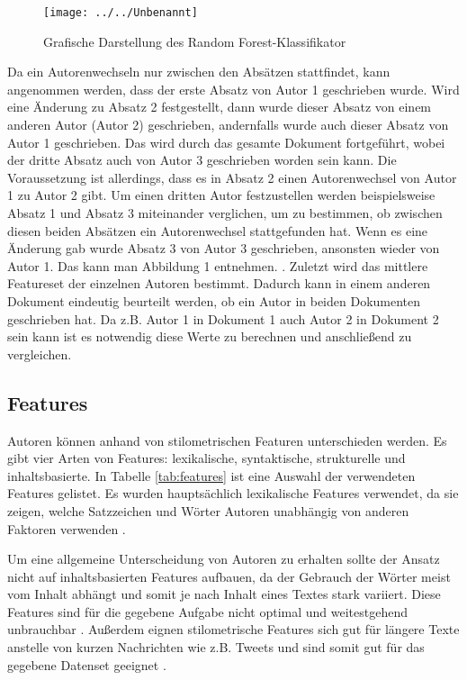 \documentclass[conference]{IEEEtran}
\begin{document}
	\begin{figure}[h]
		\centering
		\texttt{[image: ../../Unbenannt]}
		\caption{Grafische Darstellung des Random Forest-Klassifikator}
		\label{fig:algorithm}
	\end{figure}
	
	
	Da ein Autorenwechseln nur zwischen den Absätzen stattfindet, kann angenommen werden, dass der erste Absatz von Autor 1 geschrieben wurde. Wird eine Änderung zu Absatz 2 festgestellt, dann wurde dieser Absatz von einem anderen Autor (Autor 2) geschrieben, andernfalls wurde auch dieser Absatz von Autor 1 geschrieben. Das wird durch das gesamte Dokument fortgeführt, wobei der dritte Absatz auch von Autor 3  geschrieben worden sein kann. Die Voraussetzung ist allerdings, dass es in Absatz 2 einen Autorenwechsel von Autor 1 zu Autor 2 gibt. Um einen dritten Autor festzustellen werden beispielsweise Absatz 1 und Absatz 3 miteinander verglichen, um zu bestimmen, ob zwischen diesen beiden Absätzen ein Autorenwechsel stattgefunden hat. Wenn es eine Änderung gab wurde Absatz 3 von Autor 3 geschrieben, ansonsten wieder von Autor 1. Das kann man Abbildung 1 entnehmen. 
	.
	Zuletzt wird das mittlere Featureset der einzelnen Autoren bestimmt. Dadurch kann in einem anderen Dokument eindeutig beurteilt werden, ob ein Autor in beiden Dokumenten geschrieben hat. Da z.B. Autor 1 in Dokument 1 auch Autor 2 in Dokument 2 sein kann ist es notwendig diese Werte zu berechnen und anschließend zu vergleichen.
	
\subsection{Features}
	Autoren können anhand von stilometrischen Featuren unterschieden werden. Es gibt vier Arten von Features: lexikalische, syntaktische, strukturelle und inhaltsbasierte. In Tabelle \ref{tab:features} ist eine Auswahl der verwendeten Features gelistet. Es wurden hauptsächlich lexikalische Features verwendet, da sie zeigen, welche Satzzeichen und Wörter Autoren unabhängig von anderen Faktoren verwenden \cite{mf_b1}.
	 
	Um eine allgemeine Unterscheidung von Autoren zu erhalten sollte der Ansatz nicht auf inhaltsbasierten Features aufbauen, da der Gebrauch der Wörter meist vom Inhalt abhängt und somit je nach Inhalt eines Textes stark variiert. Diese Features sind für die gegebene Aufgabe nicht optimal und weitestgehend unbrauchbar \cite{mf_b2}.
	Außerdem eignen stilometrische Features sich gut für längere Texte anstelle von kurzen Nachrichten wie z.B. Tweets und sind somit gut für das gegebene Datenset geeignet \cite{mf_b3}.
	
\end{document}

